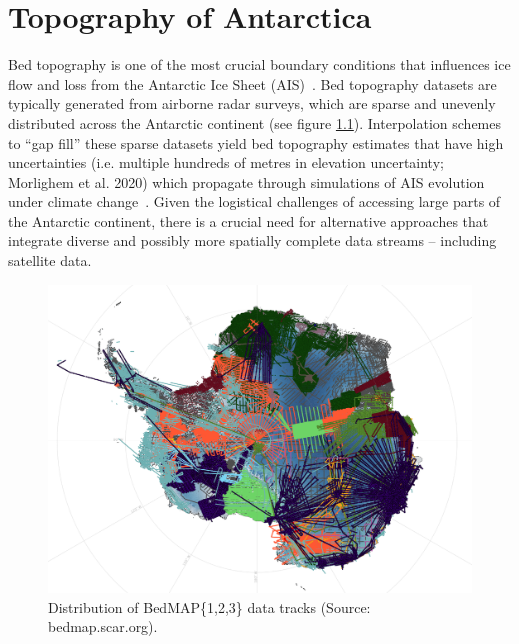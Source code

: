 \chapter{Topography of Antarctica}\label{review}
Bed topography is one of the most crucial boundary conditions that influences ice flow and loss from the Antarctic Ice Sheet (AIS)~\cite{Morlighem_2020}. Bed topography datasets are typically generated from airborne radar surveys, which are sparse and unevenly distributed across the Antarctic continent (see figure \ref{fig:BedMAP}). Interpolation schemes to ``gap fill'' these sparse datasets yield bed topography estimates that have high uncertainties (i.e. multiple hundreds of metres in elevation uncertainty; Morlighem et al. 2020) which propagate through simulations of AIS evolution under climate change~\cite{Castleman_2022}. Given the logistical challenges of accessing large parts of the Antarctic continent, there is a crucial need for alternative approaches that integrate diverse and possibly more spatially complete data streams – including satellite data.
\begin{figure}[H]
    \includegraphics[scale=0.31]{bedmap.png}
    \caption{Distribution of BedMAP\{1,2,3\} data tracks (Source: bedmap.scar.org).}
    \label{fig:BedMAP}
\end{figure}
\newpage
